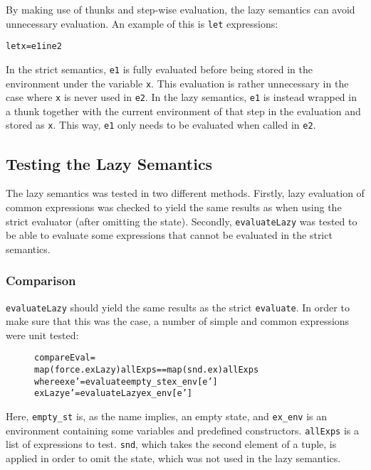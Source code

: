 By making use of thunks and step-wise evaluation, the lazy semantics can avoid unnecessary
evaluation. An example of this is \texttt{let} expressions:
\begin{alltt}
  let x = e1 in e2
\end{alltt}
In the strict semantics, \texttt{e1} is fully evaluated before being stored in the
environment under the variable \texttt{x}. 
This evaluation is rather unnecessary in the case where \texttt{x} is never used in
\texttt{e2}. In the lazy semantics, \texttt{e1} is instead wrapped in a thunk together with
the current environment of that step in the evaluation and stored as \texttt{x}. This way,
\texttt{e1} only needs to be evaluated when called in \texttt{e2}.

\subsection{Testing the Lazy Semantics}
\label{LazySemTest}

The lazy semantics was tested in two different methods.
Firstly, lazy evaluation of common
expressions was checked to yield the same results as when using the strict
evaluator (after omitting the state). Secondly, \texttt{evaluateLazy}
was tested to be able to evaluate some expressions that cannot be evaluated
in the strict semantics.


\subsubsection{Comparison}

\texttt{evaluateLazy} should yield the same results as the strict
\texttt{evaluate}. In order to make sure that this was the case, a number of
simple and common expressions were unit tested:

\begin{figure}[!ht]
\begin{alltt}
  compareEval =
    map (force . exLazy) allExps == map (snd . ex) allExps
      where ex     e' = evaluate empty_st ex_env [e']
            exLazy e' = evaluateLazy ex_env [e']
\end{alltt}
\end{figure}

\noindent Here, \texttt{empty\_st} is, as the name implies, an empty state, and
\texttt{ex\_env} is an environment containing some variables and predefined
constructors. \texttt{allExps} is a list of expressions to test.
\texttt{snd}, which takes the second element of a tuple, is applied in order to
omit the state, which was not used in the lazy semantics.


